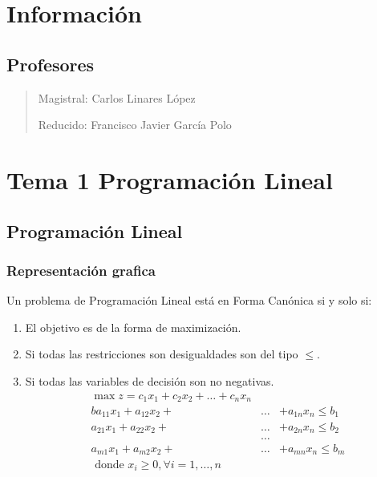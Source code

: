 \documentclass[12pt, twoside, openright]{report} %
\begin{document}
\listoffigures
\thispagestyle{fancy}





\chapter{Información}
\section{Profesores}
\begin{quote}
Magistral: Carlos Linares López 

Reducido: Francisco Javier García Polo
  \end{quote}



\chapter{Tema 1 Programación Lineal}

  \section{Programación Lineal}

  \subsection{Representación grafica}


    Un problema de Programación Lineal está en Forma Canónica si y solo
    si:

    \begin{enumerate}
    \def\labelenumi{\arabic{enumi}.}
    \item
      El objetivo es de la forma de maximización.
    \item
      Si todas las restricciones son desigualdades son del tipo $\leq$.
    \item
      Si todas las variables de decisión son no negativas.
	  \begin{eqnarray*} 
		\max z = c_1x_1+c_2x_2 + \ldots +c_nx_n \\ 
		ba_{11}x_1 +a_{12}x_2 +&\ldots& +a_{1n}x_n \leq b_1 \\ 
		a_{21}x_1 +a_{22}x_2 +&\ldots& +a_{2n}x_n \leq b_2 \\ 
		&\ldots& \\ 
		a_{m1}x_1 +a_{m2}x_2 +&\ldots& +a_{mn}x_n \leq b_m \\ 
		\text { donde } x_{i} \geq 0, \forall i=1, \ldots, n
	  \end{eqnarray*}
    \end{enumerate}
\end{document}
